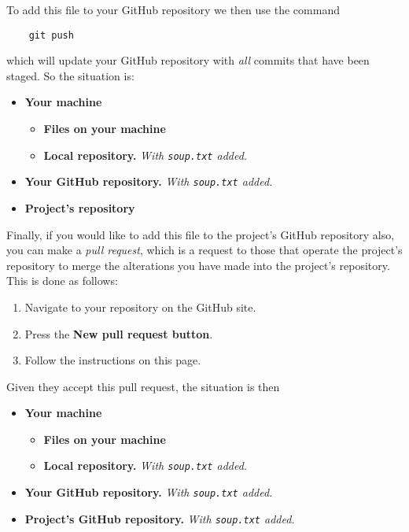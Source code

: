 \documentclass[11pt]{amsart}
\newcommand{\code}[1]{\texttt{#1}}
\begin{document}
To add this file to your GitHub repository we then use the command 

\begin{BVerbatim}
    git push
\end{BVerbatim}

which will update your GitHub repository with \emph{all} commits that have been staged. So the situation is:
\begin{itemize}
    \item \textbf{Your machine}
    \begin{itemize}
        \item \textbf{Files on your machine}
        \item \textbf{Local repository.} \emph{With \code{soup.txt} added.}
    \end{itemize}
    \item \textbf{Your GitHub repository.} \emph{With \code{soup.txt} added.}
    \item \textbf{Project's repository}
\end{itemize}
    
Finally, if you would like to add this file to the project's GitHub repository also, you can make a \emph{pull request}, which is a request  to those that operate the project's repository to merge the alterations you have made into the project's repository. This is done as follows: 
\begin{enumerate}
    \item Navigate to your repository on the GitHub site. 
    \item Press the \textbf{New pull request button}.
    \item Follow the instructions on this page.
\end{enumerate}

Given they accept this pull request, the situation is then
\begin{itemize}
    \item \textbf{Your machine}
    \begin{itemize}
        \item \textbf{Files on your machine}
        \item \textbf{Local repository.} \emph{With \code{soup.txt} added.}
    \end{itemize}
    \item \textbf{Your GitHub repository.} \emph{With \code{soup.txt} added.}
    \item \textbf{Project's GitHub repository.} \emph{With \code{soup.txt} added.}
\end{itemize}
\end{document}
